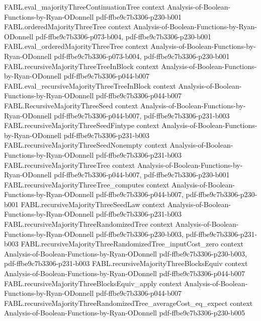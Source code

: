 \begin{theorem}
\proofstep
  {FABL.eval_majorityThreeContinuationTree}
  {context}
  {Analysis-of-Boolean-Functions-by-Ryan-ODonnell}
  {pdf-ffbe9c7b3306-p230-b001}
\proofstep
  {FABL.orderedMajorityThreeTree}
  {context}
  {Analysis-of-Boolean-Functions-by-Ryan-ODonnell}
  {pdf-ffbe9c7b3306-p073-b004,
    pdf-ffbe9c7b3306-p230-b001}
\proofstep
  {FABL.eval_orderedMajorityThreeTree}
  {context}
  {Analysis-of-Boolean-Functions-by-Ryan-ODonnell}
  {pdf-ffbe9c7b3306-p073-b004,
    pdf-ffbe9c7b3306-p230-b001}
\proofstep
  {FABL.recursiveMajorityThreeTreeInBlock}
  {context}
  {Analysis-of-Boolean-Functions-by-Ryan-ODonnell}
  {pdf-ffbe9c7b3306-p044-b007}
\proofstep
  {FABL.eval_recursiveMajorityThreeTreeInBlock}
  {context}
  {Analysis-of-Boolean-Functions-by-Ryan-ODonnell}
  {pdf-ffbe9c7b3306-p044-b007}
\proofstep
  {FABL.RecursiveMajorityThreeSeed}
  {context}
  {Analysis-of-Boolean-Functions-by-Ryan-ODonnell}
  {pdf-ffbe9c7b3306-p044-b007,
    pdf-ffbe9c7b3306-p231-b003}
\proofstep
  {FABL.recursiveMajorityThreeSeedFintype}
  {context}
  {Analysis-of-Boolean-Functions-by-Ryan-ODonnell}
  {pdf-ffbe9c7b3306-p231-b003}
\proofstep
  {FABL.recursiveMajorityThreeSeedNonempty}
  {context}
  {Analysis-of-Boolean-Functions-by-Ryan-ODonnell}
  {pdf-ffbe9c7b3306-p231-b003}
\proofstep
  {FABL.recursiveMajorityThreeTree}
  {context}
  {Analysis-of-Boolean-Functions-by-Ryan-ODonnell}
  {pdf-ffbe9c7b3306-p044-b007,
    pdf-ffbe9c7b3306-p230-b001}
\proofstep
  {FABL.recursiveMajorityThreeTree_computes}
  {context}
  {Analysis-of-Boolean-Functions-by-Ryan-ODonnell}
  {pdf-ffbe9c7b3306-p044-b007,
    pdf-ffbe9c7b3306-p230-b001}
\proofstep
  {FABL.recursiveMajorityThreeSeedLaw}
  {context}
  {Analysis-of-Boolean-Functions-by-Ryan-ODonnell}
  {pdf-ffbe9c7b3306-p231-b003}
\proofstep
  {FABL.recursiveMajorityThreeRandomizedTree}
  {context}
  {Analysis-of-Boolean-Functions-by-Ryan-ODonnell}
  {pdf-ffbe9c7b3306-p230-b003,
    pdf-ffbe9c7b3306-p231-b003}
\proofstep
  {FABL.recursiveMajorityThreeRandomizedTree_inputCost_zero}
  {context}
  {Analysis-of-Boolean-Functions-by-Ryan-ODonnell}
  {pdf-ffbe9c7b3306-p230-b003,
    pdf-ffbe9c7b3306-p231-b003}
\proofstep
  {FABL.recursiveMajorityThreeBlocksEquiv}
  {context}
  {Analysis-of-Boolean-Functions-by-Ryan-ODonnell}
  {pdf-ffbe9c7b3306-p044-b007}
\proofstep
  {FABL.recursiveMajorityThreeBlocksEquiv_apply}
  {context}
  {Analysis-of-Boolean-Functions-by-Ryan-ODonnell}
  {pdf-ffbe9c7b3306-p044-b007}
\proofstep
  {FABL.recursiveMajorityThreeRandomizedTree_averageCost_eq_expect}
  {context}
  {Analysis-of-Boolean-Functions-by-Ryan-ODonnell}
  {pdf-ffbe9c7b3306-p230-b005}

\end{theorem}
